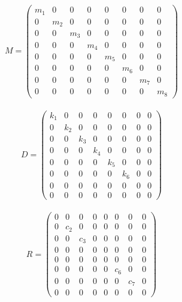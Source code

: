\begin{eqnarray}
    M = 
    \left(\begin{matrix}
        m_1 & 0   & 0   & 0   & 0   & 0   & 0   & 0   \\
        0   & m_2 & 0   & 0   & 0   & 0   & 0   & 0   \\
        0   & 0   & m_3 & 0   & 0   & 0   & 0   & 0   \\
        0   & 0   & 0   & m_4 & 0   & 0   & 0   & 0   \\
        0   & 0   & 0   & 0   & m_5 & 0   & 0   & 0   \\
        0   & 0   & 0   & 0   & 0   & m_6 & 0   & 0   \\
        0   & 0   & 0   & 0   & 0   & 0   & m_7 & 0   \\
        0   & 0   & 0   & 0   & 0   & 0   & 0   & m_8  
    \end{matrix}\right)
\end{eqnarray}

\begin{eqnarray}
    D =
    \left(\begin{matrix}
        k_1 & 0   & 0   & 0   & 0   & 0   & 0   & 0   \\
        0   & k_2 & 0   & 0   & 0   & 0   & 0   & 0   \\
        0   & 0   & k_3 & 0   & 0   & 0   & 0   & 0   \\
        0   & 0   & 0   & k_4 & 0   & 0   & 0   & 0   \\
        0   & 0   & 0   & 0   & k_5 & 0   & 0   & 0   \\
        0   & 0   & 0   & 0   & 0   & k_6 & 0   & 0   \\
        0   & 0   & 0   & 0   & 0   & 0   & 0   & 0   \\
        0   & 0   & 0   & 0   & 0   & 0   & 0   & 0   
    \end{matrix}\right)
\end{eqnarray}

\begin{eqnarray}
    R = 
    \left(\begin{matrix}
        0   & 0   & 0   & 0   & 0   & 0   & 0   & 0   \\
        0   & c_2 & 0   & 0   & 0   & 0   & 0   & 0   \\
        0   & 0   & c_3 & 0   & 0   & 0   & 0   & 0   \\
        0   & 0   & 0   & 0   & 0   & 0   & 0   & 0   \\
        0   & 0   & 0   & 0   & 0   & 0   & 0   & 0   \\
        0   & 0   & 0   & 0   & 0   & c_6 & 0   & 0   \\
        0   & 0   & 0   & 0   & 0   & 0   & c_7 & 0   \\
        0   & 0   & 0   & 0   & 0   & 0   & 0   & 0   
    \end{matrix}\right)
\end{eqnarray}

